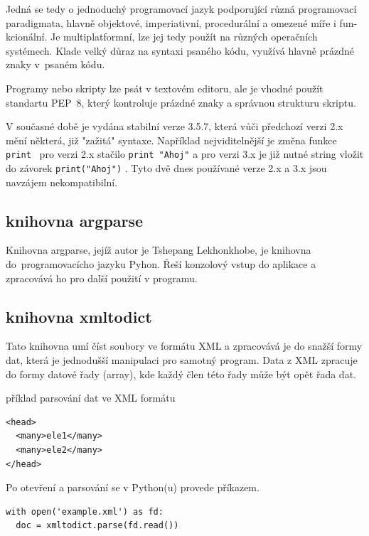 Jedná se tedy o jednoduchý programovací jazyk podporující různá programovací 
paradigmata, hlavně objektové, imperiativní, procedurální a omezené míře i 
fun- kcionální. Je multiplatformní, lze jej tedy použít na různých operačních 
systémech. Klade velký důraz na syntaxi psaného kódu, využívá hlavně prázdné 
znaky v~psaném kódu.  

Programy nebo skripty lze psát v textovém editoru, ale je vhodné použít 
standartu PEP~8, který kontroluje prázdné znaky a správnou strukturu skriptu. 

V současné době je vydána stabilní verze 3.5.7, která vůči předchozí verzi 2.x
mění některá, již "zažitá" syntaxe. Například nejviditelnější je změna funkce 
{\tt print } pro verzi 2.x stačilo  {\tt print "Ahoj"}  a pro verzi 3.x je již
nutné string vložit do závorek  {\tt print("Ahoj")}  . Tyto dvě dnes používané 
verze 2.x a 3.x jsou navzájem nekompatibilní.
\cite{python} 
\cite{wikiPython} 
  
  
\subsection{knihovna argparse}
\label{argparse} 
Knihovna argparse, jejíž autor je Tshepang Lekhonkhobe, je knihovna 
do~programovacícho jazyku Pyhon. Řeší konzolový vstup do aplikace a zpracovává 
ho pro další použití v programu. 


\subsection{knihovna xmltodict}
\label{xmltodict} 
Tato knihovna umí číst soubory ve formátu XML a zpracovává je do snažší formy 
dat, která je jednodušší manipulaci pro samotný program. Data z XML zpracuje
do formy datové řady (array), kde každý člen této řady může být opět řada dat.\cite{xmltodict}

příklad parsování dat ve XML formátu

{\scriptsize
\begin{lstlisting}
<head>
  <many>ele1</many>
  <many>ele2</many>
</head>
\end{lstlisting}
}

Po otevření a parsování se v Python(u) provede příkazem.

{\scriptsize
\lstset{language=Python}
\begin{lstlisting}
with open('example.xml') as fd: 
  doc = xmltodict.parse(fd.read()) 
\end{lstlisting}
}

